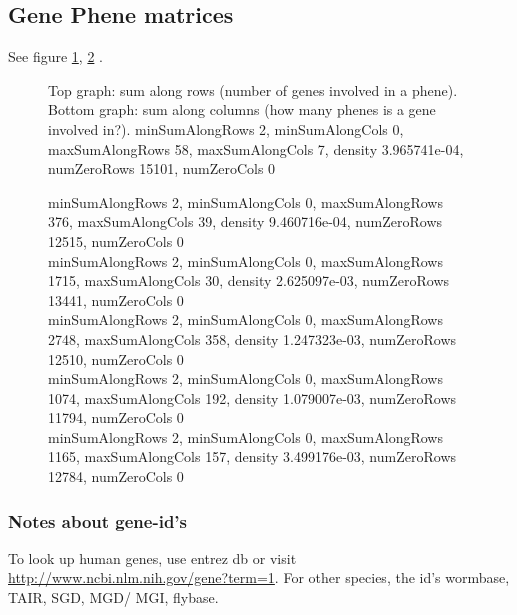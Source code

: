 \documentclass{report}
\begin{document}
\subsection{Gene Phene matrices}
See figure \ref{fig:P(1,1)}, \ref{fig:P(1,x)}
.
\begin{figure}
  \begin{center}
  \end{center}
\caption{Top graph: sum along rows (number of genes involved in a phene). Bottom graph: sum along columns (how many phenes is a gene involved in?). 
minSumAlongRows 2, minSumAlongCols 0, maxSumAlongRows 58, maxSumAlongCols 7, density 3.965741e-04, numZeroRows 15101, numZeroCols 0
}
\label{fig:P(1,1)}
\end{figure}

\begin{figure}

\caption{
minSumAlongRows 2, minSumAlongCols 0, maxSumAlongRows 376, maxSumAlongCols 39, density 9.460716e-04, numZeroRows 12515, numZeroCols 0 \\
minSumAlongRows 2, minSumAlongCols 0, maxSumAlongRows 1715, maxSumAlongCols 30, density 2.625097e-03, numZeroRows 13441, numZeroCols 0 \\
minSumAlongRows 2, minSumAlongCols 0, maxSumAlongRows 2748, maxSumAlongCols 358, density 1.247323e-03, numZeroRows 12510, numZeroCols 0 \\
minSumAlongRows 2, minSumAlongCols 0, maxSumAlongRows 1074, maxSumAlongCols 192, density 1.079007e-03, numZeroRows 11794, numZeroCols 0 \\
minSumAlongRows 2, minSumAlongCols 0, maxSumAlongRows 1165, maxSumAlongCols 157, density 3.499176e-03, numZeroRows 12784, numZeroCols 0}
\label{fig:P(1,x)}
\end{figure}



\subsubsection{Notes about gene-id's}
To look up human genes, use entrez db or visit  \url{http://www.ncbi.nlm.nih.gov/gene?term=1}. For other species, the id's wormbase, TAIR, SGD, MGD/ MGI, flybase.
\end{document}
